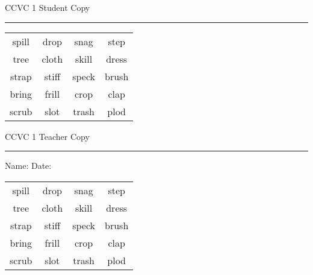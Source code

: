 \documentclass{memoir}
\begin{document}

\footnotesize \noindent
CCVC 1 \hfill Student Copy
\smallskip
\hrule

\Large

\setlength{\tabcolsep}{14pt}
\def\arraystretch{3}

{\selectfont


\begin{vplace}[0.5]
\begin{center}
\begin{tabular}{cccc}
spill & drop & snag & step \\
tree & cloth & skill & dress \\
strap & stiff & speck & brush \\
bring      & frill & crop & clap             \\
scrub & slot & trash & plod \\
\end{tabular}
\end{center}
\end{vplace}

}

\newpage

\footnotesize \noindent
CCVC 1 \hfill Teacher Copy
\smallskip
\hrule

\normalsize

\vfill

\noindent
Name: \underline{\hspace{1.75in}} \hfill Date: \underline{\hspace{1in}}

\Large

{\selectfont


\begin{vplace}[0.5]
\begin{center}
\begin{tabular}{cccc}
spill & drop & snag & step \\
tree & cloth & skill & dress \\
strap & stiff & speck & brush \\
bring      & frill & crop & clap             \\
scrub & slot & trash & plod \\
\end{tabular}
\end{center}
\end{vplace}



}
\end{document}
